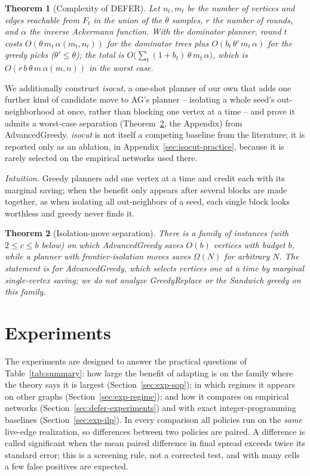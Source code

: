 \documentclass[11pt]{article}
\newtheorem{theorem}{Theorem}
\theoremstyle{definition}
\theoremstyle{remark}
\begin{document}
\begin{theorem}[Complexity of DEFER]\label{thm:defer-complexity}
Let $n_t,m_t$ be the number of vertices and edges reachable from $F_t$ in
the union of the $\theta$ samples, $r$ the number of rounds, and $\alpha$
the inverse Ackermann function. With the dominator planner, round $t$ costs
$O(\theta\,m_t\,\alpha(m_t,n_t))$ for the dominator trees plus
$O(b_t\,\theta'\,m_t\,\alpha)$ for the greedy picks ($\theta'\le\theta$);
the total is $O\bigl(\sum_t(1+b_t)\,\theta\,m_t\,\alpha\bigr)$, which is
$O(r\,b\,\theta\,m\,\alpha(m,n))$ in the worst case.
\end{theorem}

We additionally construct \emph{isocut}, a one-shot planner of our own
that adds one further kind of candidate move to AG's planner --
isolating a whole seed's out-neighborhood at once, rather than blocking
one vertex at a time -- and prove it admits a worst-case separation
(Theorem~\ref{thm:isocut-separation}, the Appendix) from AdvancedGreedy. \emph{isocut} is not itself a competing baseline from the
literature; it is reported only as an ablation, in
Appendix~\ref{sec:isocut-practice}, because it is rarely selected
on the empirical networks used there.

\emph{Intuition.} Greedy planners add one vertex at a time and credit each
with its marginal saving; when the benefit only appears after several
blocks are made together, as when isolating all out-neighbors of a seed, each
single block looks worthless and greedy never finds it.

\begin{theorem}[Isolation-move separation]\label{thm:isocut-separation}
There is a family of instances (with $2\le c\le b$ below) on which AdvancedGreedy saves $O(b)$ vertices with budget $b$,
while a planner with frontier-isolation moves saves $\Omega(N)$ for
arbitrary $N$. The statement is for AdvancedGreedy, which selects vertices one at a time by marginal single-vertex saving; we do not analyze GreedyReplace or the Sandwich greedy on this family.
\end{theorem}

\section{Experiments}\label{sec:experiments}

The experiments are designed to answer the practical questions of Table~\ref{tab:summary}: how large the benefit of adapting is on the family where the theory says it is largest (Section~\ref{sec:exp-sop}); in which regimes it appears on other graphs (Section~\ref{sec:exp-regime}); and how it compares on empirical networks (Section~\ref{sec:defer-experiments}) and with exact integer-programming baselines (Section~\ref{sec:exp-ilp}). In every comparison all policies run on the \emph{same} live-edge realization, so differences between two policies are paired. A difference is called significant when the mean paired difference in final spread exceeds twice its standard error; this is a screening rule, not a corrected test, and with many cells a few false positives are expected.
\end{document}
